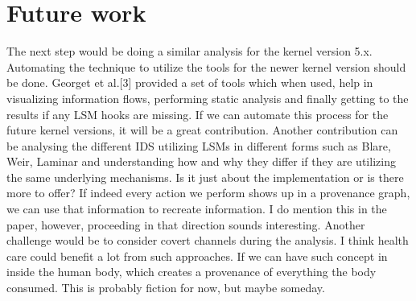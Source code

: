 \section{Future work}
The next step would be doing a similar analysis for the kernel version 5.x. Automating the technique to utilize the tools for the newer kernel version should be done. Georget et al.[3] provided a set of tools which when used, help in visualizing information flows, performing static analysis and finally getting to the results if any LSM hooks are missing. If we can automate this process for the future kernel versions, it will be a great contribution. 
\vskip 0.1in
Another contribution can be analysing the different IDS utilizing LSMs in different forms such as Blare, Weir, Laminar and understanding how and why they differ if they are utilizing the same underlying mechanisms. Is it just about the implementation or is there more to offer?
\vskip 0.1in
If indeed every action we perform shows up in a provenance graph, we can use that information to recreate information. I do mention this in the paper, however, proceeding in that direction sounds interesting. 
\vskip 0.1in
Another challenge would be to consider covert channels during the analysis.
\vskip 0.1in
I think health care could benefit a lot from such approaches. If we can have such concept in inside the human body, which creates a provenance of everything the body consumed. This is probably fiction for now, but maybe someday.

